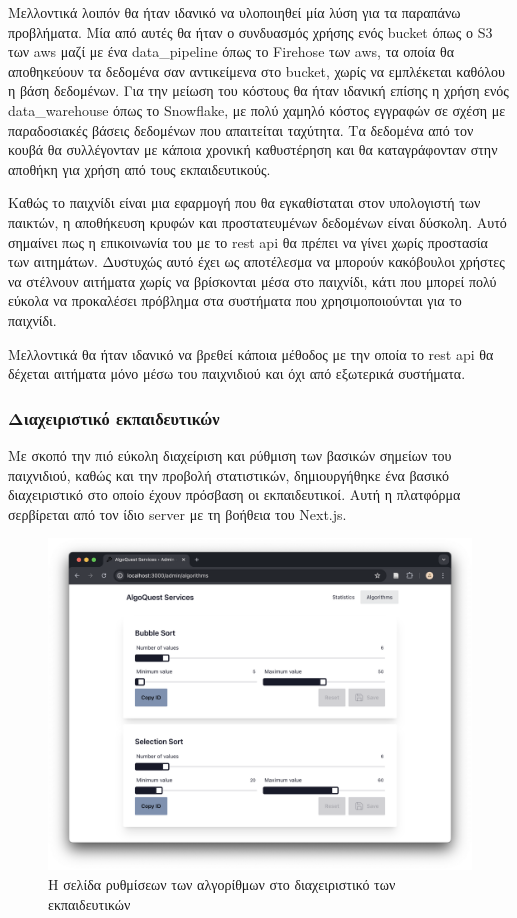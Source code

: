 Μελλοντικά λοιπόν θα ήταν ιδανικό να υλοποιηθεί μία λύση για τα παραπάνω προβλήματα. Μία από αυτές θα ήταν ο συνδυασμός χρήσης ενός \gls{bucket} όπως ο S3 των \acrfull{aws}\cite{noauthor_amazon_nodate} μαζί με ένα \gls{data_pipeline} όπως το Firehose των \acrshort{aws}\cite{noauthor_amazon_nodate-1}, τα οποία θα αποθηκεύουν τα δεδομένα σαν αντικείμενα στο \gls{bucket}, χωρίς να εμπλέκεται καθόλου η βάση δεδομένων. Για την μείωση του κόστους θα ήταν ιδανική επίσης η χρήση ενός \gls{data_warehouse} όπως το Snowflake\cite{noauthor_snowflake_nodate}, με πολύ χαμηλό κόστος εγγραφών σε σχέση με παραδοσιακές βάσεις δεδομένων που απαιτείται ταχύτητα. Τα δεδομένα από τον κουβά θα συλλέγονταν με κάποια χρονική καθυστέρηση και θα καταγράφονταν στην αποθήκη για χρήση από τους εκπαιδευτικούς.

Καθώς το παιχνίδι είναι μια εφαρμογή που θα εγκαθίσταται στον υπολογιστή των παικτών, η αποθήκευση κρυφών και προστατευμένων δεδομένων είναι δύσκολη. Αυτό σημαίνει πως η επικοινωνία του με το \acrshort{rest} \acrshort{api} θα πρέπει να γίνει χωρίς προστασία των αιτημάτων. Δυστυχώς αυτό έχει ως αποτέλεσμα να μπορούν κακόβουλοι χρήστες να στέλνουν αιτήματα χωρίς να βρίσκονται μέσα στο παιχνίδι, κάτι που μπορεί πολύ εύκολα να προκαλέσει πρόβλημα στα συστήματα που χρησιμοποιούνται για το παιχνίδι.

Μελλοντικά θα ήταν ιδανικό να βρεθεί κάποια μέθοδος με την οποία το \acrshort{rest} \acrshort{api} θα δέχεται αιτήματα μόνο μέσω του παιχνιδιού και όχι από εξωτερικά συστήματα.


\subsubsection{Διαχειριστικό εκπαιδευτικών}

Με σκοπό την πιό εύκολη διαχείριση και ρύθμιση των βασικών σημείων του παιχνιδιού, καθώς και την προβολή στατιστικών, δημιουργήθηκε ένα βασικό διαχειριστικό στο οποίο έχουν πρόσβαση οι εκπαιδευτικοί. Αυτή η πλατφόρμα σερβίρεται από τον ίδιο \gls{server} με τη βοήθεια του Next.js.

\begin{figure}[H]
    \centering
    \includegraphics[width=0.7\linewidth]{sections/4/1/images/admin_dashboard_algorithm_config}
    \caption{Η σελίδα ρυθμίσεων των αλγορίθμων στο διαχειριστικό των εκπαιδευτικών}
    \label{fig:admin_dashboard_algorithm_config}
\end{figure}

